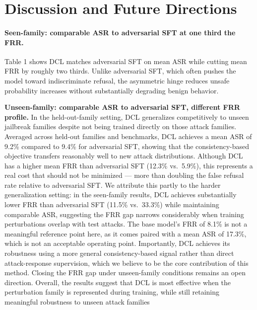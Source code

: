 \documentclass{article}
\begin{document}
\section{Discussion and Future Directions}
\label{sec:discussion}
\paragraph{Seen-family: comparable ASR to adversarial SFT at one third the FRR.}
Table 1 shows DCL matches adversarial SFT on mean ASR while cutting mean FRR by roughly two thirds. Unlike adversarial SFT, which often pushes the model toward indiscriminate refusal, the asymmetric hinge reduces unsafe probability increases without substantially degrading benign behavior.

\textbf{Unseen-family: comparable ASR to adversarial SFT, different FRR profile.} In the held-out-family setting, DCL generalizes competitively to unseen jailbreak families despite not being trained directly on those attack families. Averaged across held-out families and benchmarks, DCL achieves a mean ASR of 9.2\% compared to 9.4\% for adversarial SFT, showing that the consistency-based objective transfers reasonably well to new attack distributions. Although DCL has a higher mean FRR than adversarial SFT (12.3\% vs.\ 5.9\%), this represents a real cost that should not be minimized --- more than doubling the false refusal rate relative to adversarial SFT. We attribute this partly to the harder generalization setting: in the seen-family results, DCL achieves substantially lower FRR than adversarial SFT (11.5\% vs.\ 33.3\%) while maintaining comparable ASR, suggesting the FRR gap narrows considerably when training perturbations overlap with test attacks. The base model's FRR of 8.1\% is not a meaningful reference point here, as it comes paired with a mean ASR of 17.3\%, which is not an acceptable operating point. Importantly, DCL achieves its robustness using a more general consistency-based signal rather than direct attack-response supervision, which we believe to be the core contribution of this method. Closing the FRR gap under unseen-family conditions remains an open direction. Overall, the results suggest that DCL is most effective when the perturbation family is represented during training, while still retaining meaningful robustness to unseen attack families


\end{document}
